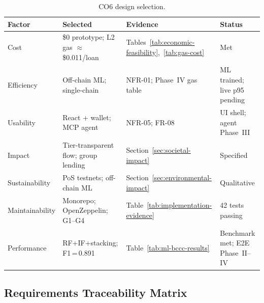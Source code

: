 \begin{table}[H]
\centering
\caption[CO6 design selection]{CO6 design selection.}
\label{tab:co6-selection-summary}
\small
\begin{tabular}{@{}p{2.2cm}p{3.6cm}p{4.0cm}p{4.4cm}@{}}
\toprule
\tableheadcolor
\textbf{Factor} & \textbf{Selected} & \textbf{Evidence} & \textbf{Status} \\
\midrule
Cost & \$0 prototype; L2 gas ${\approx}$\$0.011/loan & Tables~\ref{tab:economic-feasibility},~\ref{tab:gas-cost} & Met \\
Efficiency & Off-chain ML; single-chain & NFR-01; Phase~IV gas table & ML trained; live p95 pending \\
Usability & React + wallet; MCP agent & NFR-05; FR-08 & UI shell; agent Phase~III \\
Impact & Tier-transparent flow; group lending & Section~\ref{sec:societal-impact} & Specified \\
Sustainability & PoS testnets; off-chain ML & Section~\ref{sec:environmental-impact} & Qualitative \\
Maintainability & Monorepo; OpenZeppelin; G1--G4 & Table~\ref{tab:implementation-evidence} & 42 tests passing \\
Performance & RF+IF+stacking; F1\,=\,0.891 & Table~\ref{tab:ml-bccc-results} & Benchmark met; E2E Phase~II--IV \\
\bottomrule
\end{tabular}
\end{table}

\subsection{Requirements Traceability Matrix}
\label{sec:traceability}

